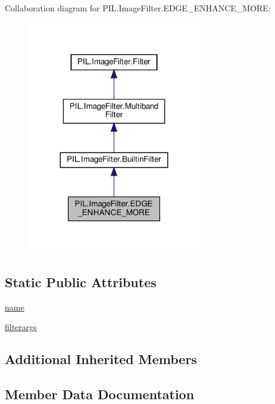 Collaboration diagram for P\+I\+L.\+Image\+Filter.\+E\+D\+G\+E\+\_\+\+E\+N\+H\+A\+N\+C\+E\+\_\+\+M\+O\+RE\+:
\nopagebreak
\begin{figure}[H]
\begin{center}
\leavevmode
\includegraphics[width=215pt]{classPIL_1_1ImageFilter_1_1EDGE__ENHANCE__MORE__coll__graph}
\end{center}
\end{figure}
\subsection*{Static Public Attributes}
\begin{DoxyCompactItemize}
\item 
\hyperlink{classPIL_1_1ImageFilter_1_1EDGE__ENHANCE__MORE_a0d1c62ce148d7857e62621759edccf01}{name}
\item 
\hyperlink{classPIL_1_1ImageFilter_1_1EDGE__ENHANCE__MORE_a2f2520ed2726cb5344cfd454d8e24b8e}{filterargs}
\end{DoxyCompactItemize}
\subsection*{Additional Inherited Members}


\subsection{Member Data Documentation}
\mbox{\label{classPIL_1_1ImageFilter_1_1EDGE__ENHANCE__MORE_a2f2520ed2726cb5344cfd454d8e24b8e}} 
